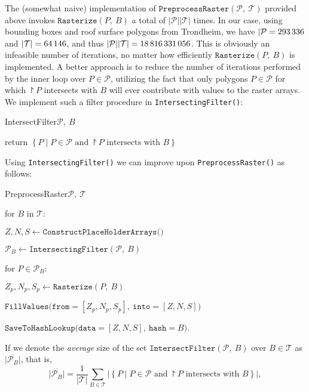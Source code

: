 The (somewhat naive) implementation of $\texttt{PreprocessRaster}(\mathcal{P},~\mathcal{T})$ provided above invokes $\texttt{Rasterize}(P,~B)$ a total of $|\mathcal{P}| |\mathcal{T}|$ times.
In our case, using bounding boxes and roof surface polygons from Trondheim, we have $|\mathcal{P} = \num{293336}$ and $|\mathcal{T}| = \num{64146}$, and thus $|\mathcal{P}||\mathcal{T}| = \num{18816331056}$.
This is obviously an infeasible number of iterations, no matter how efficiently $\texttt{Rasterize}(P,~B)$ is implemented.
A better approach is to reduce the number of iterations performed by the inner loop over $P \in \mathcal{P}$, utilizing the fact that only polygons $P \in \mathcal{P}$ for which $\project{P}$ intersects with $B$ will ever contribute with values to the raster arrays.
We implement such a filter procedure in \texttt{IntersectingFilter()}:
%
\begin{pseudofunc}{IntersectFilter}{$\mathcal{P},~B$}
  \item return $\left\{P \mid P \in \mathcal{P} \text{ and } \project{P} \text{ intersects with } B \right\}$
\end{pseudofunc}
%
Using \texttt{IntersectingFilter()} we can improve upon \texttt{PreprocessRaster()} as follows:
%
\begin{pseudofunc}{PreprocessRaster}{$\mathcal{P},~\mathcal{T}$}
  \item for $B$ in $\mathcal{T}$:
  \begin{pseudoloop}
    \item $Z, N, S \leftarrow \texttt{ConstructPlaceHolderArrays()}$
    \item $\mathcal{P}_B \leftarrow \texttt{IntersectingFilter}(\mathcal{P},~B)$
    \item for $P \in \mathcal{P}_B$:
    \begin{pseudoloop}
      \item $Z_p, N_p, S_p \leftarrow \texttt{Rasterize}(P,~B)$
      \item $\texttt{FillValues(from}=[Z_p, N_p, S_p],~\texttt{into}=[Z, N, S])$
    \end{pseudoloop}
    \item $\texttt{SaveToHashLookup(data}=[Z, N, S],~\texttt{hash}=B)$.
  \end{pseudoloop}
\end{pseudofunc}
%
If we denote the \textit{average} size of the set $\texttt{IntersectFilter}(\mathcal{P},~B)$ over $B \in \mathcal{T}$ as $\overline{|\mathcal{P}_B|}$, that is,
%
\begin{equation*}
  \overline{|\mathcal{P}_B|}
  =
  \frac{1}{|\mathcal{T}|}
  \sum_{B \in \mathcal{T}}
  \big|
    \left\{P \mid P \in \mathcal{P} \text{ and } \project{P} \text{ intersects with } B \right\}
  \big|,
\end{equation*}
